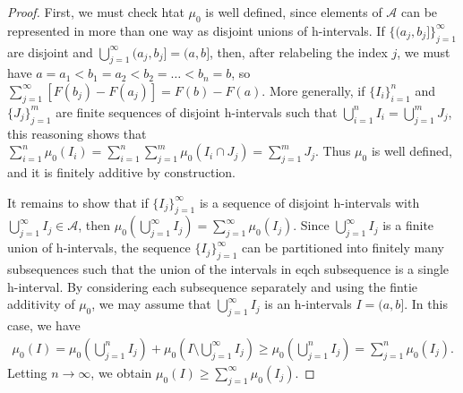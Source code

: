 \begin{proof}
    First, we must check htat $\mu_0$ is well defined, since elements of $\mathcal{A}$ can be represented in more than one way as disjoint unions of h-intervals.
    If $\{ (a_j, b_j] \}_{j=1}^{\infty}$ are disjoint and $\bigcup_{j=1}^{\infty} (a_j, b_j] = (a, b]$, then, after relabeling the index $j$, we must have $a = a_1 < b_1 = a_2 < b_2 = \dots < b_n = b$, so $\sum_{j=1}^{\infty} [F(b_j) - F(a_j)] = F(b) - F(a)$.
    More generally, if $\{ I_i \}_{i=1}^{n}$ and $\{ J_j \}_{j=1}^{m}$ are finite sequences of disjoint h-intervals such that $\bigcup_{i=1}^{n} I_i = \bigcup_{j=1}^{m} J_j$, this reasoning shows that $\sum_{i=1}^{n} \mu_0(I_i) = \sum_{i=1}^{n} \sum_{j=1}^{m} \mu_0(I_i \cap J_j) = \sum_{j=1}^{m} J_j$.
    Thus $\mu_0$ is well defined, and it is finitely additive by construction.

    It remains to show that if $\{I_j\}_{j=1}^{\infty}$ is a sequence of disjoint h-intervals with $\bigcup_{j=1}^{\infty} I_j \in \mathcal{A}$, then $\mu_0(\bigcup_{j=1}^{\infty} I_j) = \sum_{j=1}^{\infty} \mu_0(I_j)$.
    Since $\bigcup_{j=1}^{\infty} I_j$ is a finite union of h-intervals, the sequence $\{I_j\}_{j=1}^{\infty}$ can be partitioned into finitely many subsequences such that the union of the intervals in eqch subsequence is a single h-interval.
    By considering each subsequence separately and using the fintie additivity of $\mu_0$, we may assume that $\bigcup_{j=1}^{\infty} I_j$ is an h-intervals $I = (a, b]$.
    In this case, we have
    \begin{align}
        \mu_0(I) = \mu_0\left(\bigcup_{j=1}^{n} I_j\right) + \mu_0\left(I \setminus \bigcup_{j=1}^{\infty} I_j\right) \ge \mu_0\left(\bigcup_{j=1}^{n} I_j\right) = \sum_{j=1}^{n} \mu_0(I_j).
    \end{align}
    Letting $n \to \infty$, we obtain $\mu_0(I) \ge \sum_{j=1}^{\infty} \mu_0(I_j)$.


\end{proof}
